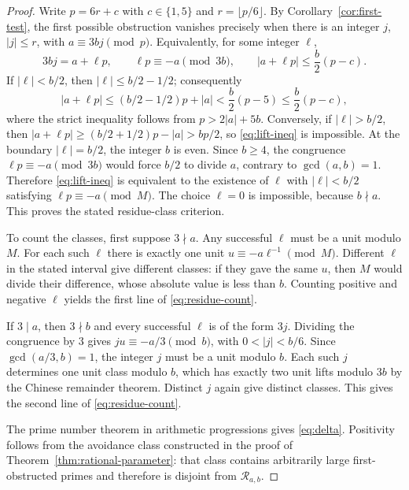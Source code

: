 \documentclass[11pt,a4paper,reqno]{amsart}
\theoremstyle{definition}
\theoremstyle{remark}
\begin{document}
\begin{proof}
Write $p=6r+c$ with $c\in\{1,5\}$ and $r=\lfloor p/6\rfloor$.
By Corollary~\ref{cor:first-test}, the first possible obstruction
vanishes precisely when there is an integer $j$, $|j|\le r$,
with $a\equiv3bj\pmod p$.  Equivalently, for some integer $\ell$,
\begin{equation}\label{eq:lift-ineq}
 3bj=a+\ell p,\qquad
 \ell p\equiv-a\pmod{3b},\qquad
 |a+\ell p|\le\frac b2(p-c).
\end{equation}
If $|\ell|<b/2$, then $|\ell|\le b/2-1/2$; consequently
\[
 |a+\ell p|\le(b/2-1/2)p+|a|
       <\frac b2(p-5)\le\frac b2(p-c),
\]
where the strict inequality follows from $p>2|a|+5b$.
Conversely, if $|\ell|>b/2$, then
$|a+\ell p|\ge(b/2+1/2)p-|a|>bp/2$,
so \eqref{eq:lift-ineq} is impossible.  At the boundary
$|\ell|=b/2$, the integer $b$ is even.  Since $b\ge4$,
the congruence $\ell p\equiv-a\pmod{3b}$ would force
$b/2$ to divide $a$, contrary to $\gcd(a,b)=1$.
Therefore \eqref{eq:lift-ineq} is equivalent to the
existence of $\ell$ with $|\ell|<b/2$ satisfying
$\ell p\equiv-a\pmod M$.  The choice $\ell=0$ is impossible,
because $b\nmid a$.  This proves the stated residue-class criterion.

To count the classes, first suppose $3\nmid a$.  Any successful
$\ell$ must be a unit modulo $M$.  For each such $\ell$ there
is exactly one unit $u\equiv-a\ell^{-1}\pmod M$.
Different $\ell$ in the stated interval give different classes:
if they gave the same $u$, then $M$ would divide their difference,
whose absolute value is less than $b$.  Counting positive and
negative $\ell$ yields the first line of \eqref{eq:residue-count}.

If $3\mid a$, then $3\nmid b$ and every successful $\ell$ is
of the form $3j$.  Dividing the congruence by $3$ gives
$j u\equiv-a/3\pmod b$, with $0<|j|<b/6$.
Since $\gcd(a/3,b)=1$, the integer $j$ must be a unit modulo $b$.
Each such $j$ determines one unit class modulo $b$, which has exactly
two unit lifts modulo $3b$ by the Chinese remainder theorem.
Distinct $j$ again give distinct classes.  This gives the
second line of \eqref{eq:residue-count}.

The prime number theorem in arithmetic progressions gives
\eqref{eq:delta}.  Positivity follows from the avoidance class
constructed in the proof of Theorem~\ref{thm:rational-parameter}:
that class contains arbitrarily large first-obstructed primes and
therefore is disjoint from $\mathcal R_{a,b}$.
\end{proof}
\end{document}
